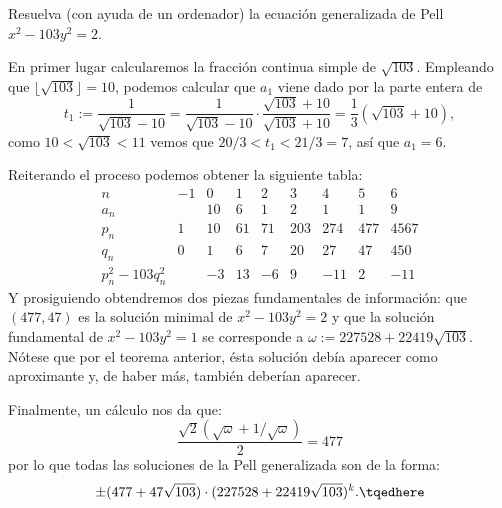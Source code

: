 \documentclass[teoria-numeros.tex]{subfiles}
\begin{document}
\begin{prob}
	Resuelva (con ayuda de un ordenador) la ecuación generalizada de Pell $x^2 - 103y^2 = 2$.
\end{prob}
\begin{sol}
	En primer lugar calcularemos la fracción continua simple de $\sqrt{103}$.
	Empleando que $\lfloor \sqrt{103} \rfloor = 10$, podemos calcular que $a_1$ viene dado por la parte entera de
	$$ t_1 := \frac{1}{\sqrt{103} - 10} = \frac{1}{\sqrt{103} - 10} \cdot \frac{\sqrt{103} + 10}{\sqrt{103} + 10} = \frac{1}{3}( \sqrt{103} + 10 ), $$
	como $10 < \sqrt{103} < 11$ vemos que $20/3 < t_1 < 21/3 = 7$, así que $a_1 = 6$.

	Reiterando el proceso podemos obtener la siguiente tabla:
	\[\begin{array}{r|*{8}{r}}
		n & -1 & 0 & 1 & 2 & 3 & 4 & 5 & 6 \\
		\hline
		a_n & {} & 10 & 6 & 1 & 2 & 1 & 1 & 9 \\
		p_n & 1 & 10 & 61 & 71 & 203 & 274 & 477 & 4567 \\
		q_n & 0 & 1 & 6 & 7 & 20 & 27 & 47 & 450 \\
		p_n^2 - 103 q_n^2 & {} & -3 & 13 & -6 & 9 & -11 & 2 & -11
	\end{array}\]
	Y prosiguiendo obtendremos dos piezas fundamentales de información:
	que $(477, 47)$ es la solución minimal de $x^2 - 103 y^2 = 2$ y que la solución fundamental de $x^2 - 103 y^2 = 1$
	se corresponde a $\omega := 227528 + 22419 \sqrt{103}$.
	Nótese que por el teorema anterior, ésta solución debía aparecer como aproximante y, de haber más,
	también deberían aparecer.

	Finalmente, un cálculo nos da que:
	$$ \frac{ \sqrt{2}( \sqrt{\omega} + 1/\sqrt{\omega} ) }{2} = 477 $$
	por lo que todas las soluciones de la Pell generalizada son de la forma:
	\begin{equation}
		\pm (477 + 47 \sqrt{103}) \cdot (227528 + 22419 \sqrt{103})^k.
		\tqedhere
	\end{equation}
\end{sol}
\end{document}
